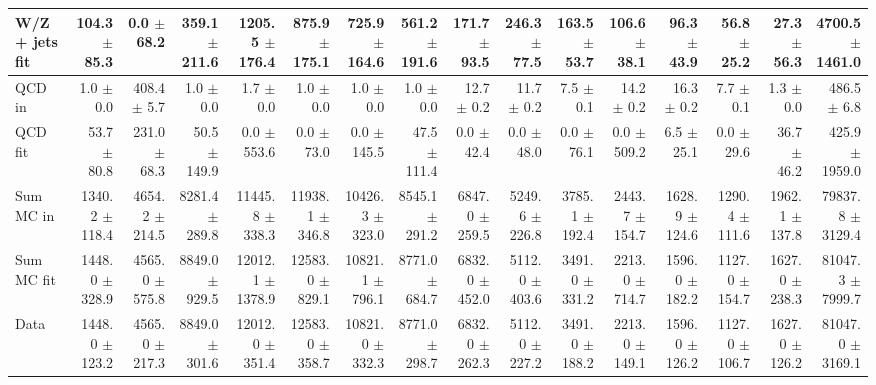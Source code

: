 \begin{table}[htbp]
{\begin{tabular}{lrrrrrrrrrrrrrrr}
W/Z + jets fit & 104.3 $\pm$ 85.3 & 0.0 $\pm$ 68.2 & 359.1 $\pm$ 211.6 & 1205.5 $\pm$ 176.4 & 875.9 $\pm$ 175.1 & 725.9 $\pm$ 164.6 & 561.2 $\pm$ 191.6 & 171.7 $\pm$ 93.5 & 246.3 $\pm$ 77.5 & 163.5 $\pm$ 53.7 & 106.6 $\pm$ 38.1 & 96.3 $\pm$ 43.9 & 56.8 $\pm$ 25.2 & 27.3 $\pm$ 56.3 & 4700.5 $\pm$ 1461.0 \\
\hline
QCD in & 1.0 $\pm$ 0.0 & 408.4 $\pm$ 5.7 & 1.0 $\pm$ 0.0 & 1.7 $\pm$ 0.0 & 1.0 $\pm$ 0.0 & 1.0 $\pm$ 0.0 & 1.0 $\pm$ 0.0 & 12.7 $\pm$ 0.2 & 11.7 $\pm$ 0.2 & 7.5 $\pm$ 0.1 & 14.2 $\pm$ 0.2 & 16.3 $\pm$ 0.2 & 7.7 $\pm$ 0.1 & 1.3 $\pm$ 0.0 & 486.5 $\pm$ 6.8 \\
QCD fit & 53.7 $\pm$ 80.8 & 231.0 $\pm$ 68.3 & 50.5 $\pm$ 149.9 & 0.0 $\pm$ 553.6 & 0.0 $\pm$ 73.0 & 0.0 $\pm$ 145.5 & 47.5 $\pm$ 111.4 & 0.0 $\pm$ 42.4 & 0.0 $\pm$ 48.0 & 0.0 $\pm$ 76.1 & 0.0 $\pm$ 509.2 & 6.5 $\pm$ 25.1 & 0.0 $\pm$ 29.6 & 36.7 $\pm$ 46.2 & 425.9 $\pm$ 1959.0 \\
\hline
Sum MC in & 1340.2 $\pm$ 118.4 & 4654.2 $\pm$ 214.5 & 8281.4 $\pm$ 289.8 & 11445.8 $\pm$ 338.3 & 11938.1 $\pm$ 346.8 & 10426.3 $\pm$ 323.0 & 8545.1 $\pm$ 291.2 & 6847.0 $\pm$ 259.5 & 5249.6 $\pm$ 226.8 & 3785.1 $\pm$ 192.4 & 2443.7 $\pm$ 154.7 & 1628.9 $\pm$ 124.6 & 1290.4 $\pm$ 111.6 & 1962.1 $\pm$ 137.8& 79837.8 $\pm$ 3129.4 \\
Sum MC fit & 1448.0 $\pm$ 328.9 & 4565.0 $\pm$ 575.8 & 8849.0 $\pm$ 929.5 & 12012.1 $\pm$ 1378.9 & 12583.0 $\pm$ 829.1 & 10821.1 $\pm$ 796.1 & 8771.0 $\pm$ 684.7 & 6832.0 $\pm$ 452.0 & 5112.0 $\pm$ 403.6 & 3491.0 $\pm$ 331.2 & 2213.0 $\pm$ 714.7 & 1596.0 $\pm$ 182.2 & 1127.0 $\pm$ 154.7 & 1627.0 $\pm$ 238.3 & 81047.3 $\pm$ 7999.7 \\
\hline
Data & 1448.0 $\pm$ 123.2 & 4565.0 $\pm$ 217.3 & 8849.0 $\pm$ 301.6 & 12012.0 $\pm$ 351.4 & 12583.0 $\pm$ 358.7 & 10821.0 $\pm$ 332.3 & 8771.0 $\pm$ 298.7 & 6832.0 $\pm$ 262.3 & 5112.0 $\pm$ 227.2 & 3491.0 $\pm$ 188.2 & 2213.0 $\pm$ 149.1 & 1596.0 $\pm$ 126.2 & 1127.0 $\pm$ 106.7 & 1627.0 $\pm$ 126.2 & 81047.0 $\pm$ 3169.1 \\
\hline
\end{tabular}
}
\end{table}
